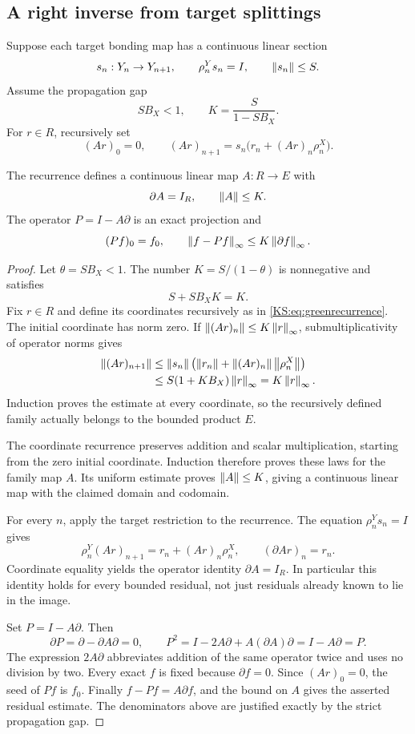 \subsection{A right inverse from target splittings}
Suppose each target bonding map has a continuous linear section
\[
 s_n:Y_n\to Y_{n+1},\qquad \rho^Y_ns_n=I,\qquad \left\lVert s_n\right\rVert\le S.
\]
Assume the propagation gap
\begin{equation}\label{KS:eq:splitgap}
 SB_X<1,\qquad K=\frac{S}{1-SB_X}.
\end{equation}
For \(r\in R\), recursively set
\begin{equation}\label{KS:eq:greenrecurrence}
 (Ar)_0=0,\qquad
 (Ar)_{n+1}=s_n\bigl(r_n+(Ar)_n\rho^X_n\bigr).
\end{equation}

\begin{KStheorem}\label{KS:KS20}
The recurrence defines a continuous linear map \(A:R\to E\) with
\[
 \partial A=I_R,\qquad \left\lVert A\right\rVert\le K.
\]
The operator \(P=I-A\partial\) is an exact projection and
\[
 (Pf)_0=f_0,\qquad
 \left\lVert f-Pf\right\rVert_\infty\le K\left\lVert\partial f\right\rVert_\infty.
\]
\end{KStheorem}
\begin{proof}
Let $\theta=SB_X<1$. The number $K=S/(1-\theta)$ is nonnegative and satisfies
\[
 S+SB_XK=K.
\]
Fix $r\in R$ and define its coordinates recursively as in \eqref{KS:eq:greenrecurrence}. The initial coordinate has norm zero. If $\left\lVert(Ar)_n\right\rVert\le K\left\lVert r\right\rVert_\infty$, submultiplicativity of operator norms gives
\[
 \begin{aligned}
 \left\lVert(Ar)_{n+1}\right\rVert
 &\le\left\lVert s_n\right\rVert\bigl(\left\lVert r_n\right\rVert+\left\lVert(Ar)_n\right\rVert\left\lVert\rho^X_n\right\rVert\bigr)\\
 &\le S(1+KB_X)\left\lVert r\right\rVert_\infty=K\left\lVert r\right\rVert_\infty.
 \end{aligned}
\]
Induction proves the estimate at every coordinate, so the recursively defined family actually belongs to the bounded product $E$.

The coordinate recurrence preserves addition and scalar multiplication, starting from the zero initial coordinate. Induction therefore proves these laws for the family map $A$. Its uniform estimate proves $\left\lVert A\right\rVert\le K$, giving a continuous linear map with the claimed domain and codomain.

For every $n$, apply the target restriction to the recurrence. The equation $\rho^Y_ns_n=I$ gives
\[
 \rho^Y_n(Ar)_{n+1}=r_n+(Ar)_n\rho^X_n,
 \qquad (\partial Ar)_n=r_n.
\]
Coordinate equality yields the operator identity $\partial A=I_R$. In particular this identity holds for every bounded residual, not just residuals already known to lie in the image.

Set $P=I-A\partial$. Then
\[
 \partial P=\partial-\partial A\partial=0,\qquad
 P^2=I-2A\partial+A(\partial A)\partial=I-A\partial=P.
\]
The expression $2A\partial$ abbreviates addition of the same operator twice and uses no division by two. Every exact $f$ is fixed because $\partial f=0$. Since $(Ar)_0=0$, the seed of $Pf$ is $f_0$. Finally $f-Pf=A\partial f$, and the bound on $A$ gives the asserted residual estimate. The denominators above are justified exactly by the strict propagation gap.
\end{proof}
